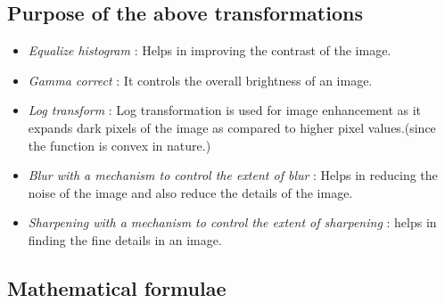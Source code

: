 \documentclass[conference]{IEEEtran}
\begin{document}
{{\subsection{Purpose of the above transformations}

\begin{itemize}
    \item \textit{Equalize histogram} : Helps in improving the contrast of the image.
    \item \textit{Gamma correct} :  It controls the overall brightness of an image.
    \item \textit{Log transform} :  Log transformation is used for image enhancement as it expands dark pixels of the image as compared to higher pixel values.(since the function is convex in nature.)
    \item  \textit{Blur with a mechanism to control the extent of blur} : Helps in reducing the noise of the image and also reduce the details of the image. 
    \item \textit{Sharpening with a mechanism to control the extent of sharpening} : helps in finding the fine details in an image.
\end{itemize}
\subsection{Mathematical formulae}

}}
\end{document}
